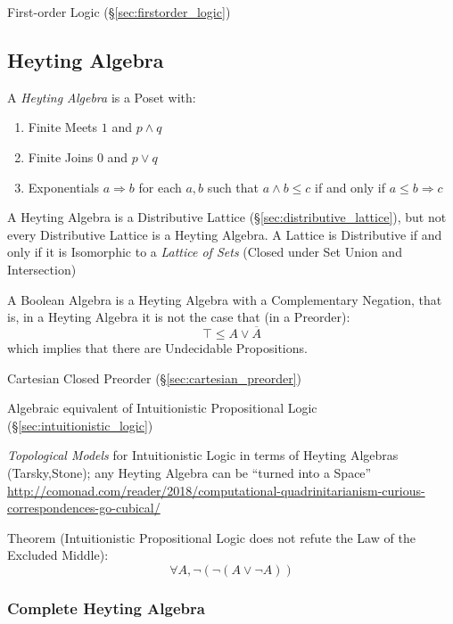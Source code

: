 First-order Logic (\S\ref{sec:firstorder_logic})



\subsection{Heyting Algebra}\label{sec:heyting_algebra}

A \emph{Heyting Algebra} is a Poset with:
\begin{enumerate}
  \item Finite Meets $1$ and $p \wedge q$
  \item Finite Joins $0$ and $p \vee q$
  \item Exponentials $a \Rightarrow b$ for each $a,b$ such that $a
    \wedge b \leq c$ if and only if $a \leq b \Rightarrow c$
\end{enumerate}
A Heyting Algebra is a Distributive Lattice
(\S\ref{sec:distributive_lattice}), but not every Distributive Lattice
is a Heyting Algebra. A Lattice is Distributive if and only if it is Isomorphic
to a \emph{Lattice of Sets} (Closed under Set Union and Intersection)

A Boolean Algebra is a Heyting Algebra with a Complementary Negation,
that is, in a Heyting Algebra it is not the case that (in a Preorder):
\[
  \top \leq A \vee \overline{A}
\]
which implies that there are Undecidable Propositions.

Cartesian Closed Preorder (\S\ref{sec:cartesian_preorder})

Algebraic equivalent of Intuitionistic Propositional Logic
(\S\ref{sec:intuitionistic_logic})

\emph{Topological Models} for Intuitionistic Logic in terms of Heyting Algebras
(Tarsky,Stone); any Heyting Algebra can be ``turned into a Space''
\url{http://comonad.com/reader/2018/computational-quadrinitarianism-curious-correspondences-go-cubical/}

Theorem (Intuitionistic Propositional Logic does not refute the Law of
the Excluded Middle)\cite{harper12}:
\[
  \forall A, \neg (\neg (A \vee \neg A))
\]



\subsubsection{Complete Heyting Algebra}\label{sec:complete_heyting_algebra}


